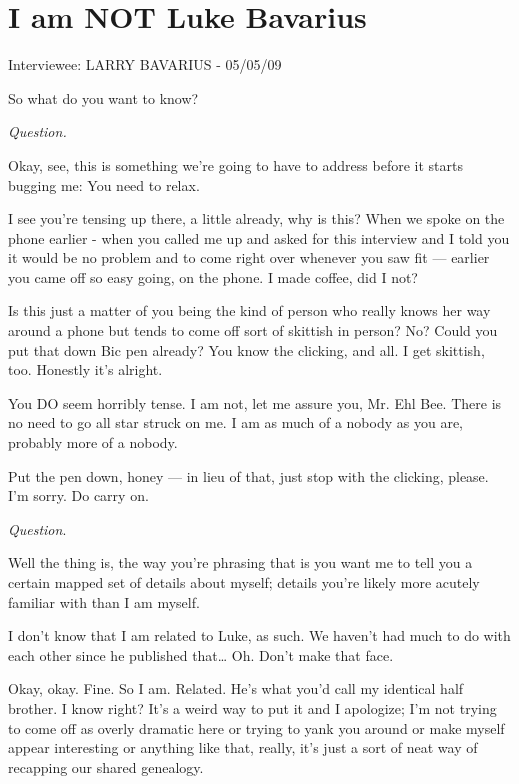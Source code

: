  



\chapter{I am NOT Luke Bavarius}


Interviewee: LARRY BAVARIUS - 05/05/09


So what do you want to know?


{\em Question.}


Okay, see, this is something we're going to have to address
before it starts bugging me: You need to relax.

I see you're tensing up there, a little already, why is this?
When we spoke on the phone earlier - when you called me up and
asked for this interview and I told you it would be no problem and
to come right over whenever you saw fit --- earlier you came
off so easy going, on the phone. I made coffee, did I not?

Is this just a matter of you being the kind of person who really
knows her way around a phone but tends to come off sort of skittish
in person? No? Could you put that down Bic pen already? You know
the clicking, and all. I get skittish, too. Honestly it's
alright.

You DO seem horribly tense. I am not, let me assure you, Mr. Ehl
Bee. There is no need to go all star struck on me. I am as much of
a nobody as you are, probably more of a nobody.

Put the pen down, honey --- in lieu of that, just stop with the
clicking, please. I'm sorry. Do carry on.



{\em Question}.



Well the thing is, the way you're phrasing that is you want
me to tell you a certain mapped set of details about myself;
details you're likely more acutely familiar with than I am
myself.

I don't know that I am related to Luke, as such. We
haven't had much to do with each other since he published
that{\ldots} Oh. Don't make that face.

Okay, okay. Fine. So I am. Related. He's what you'd
call my identical half brother. I know right? It's a weird
way to put it and I apologize; I'm not trying to come off as
overly dramatic here or trying to yank you around or make myself
appear interesting or anything like that, really, it's just a
sort of neat way of recapping our shared genealogy.

